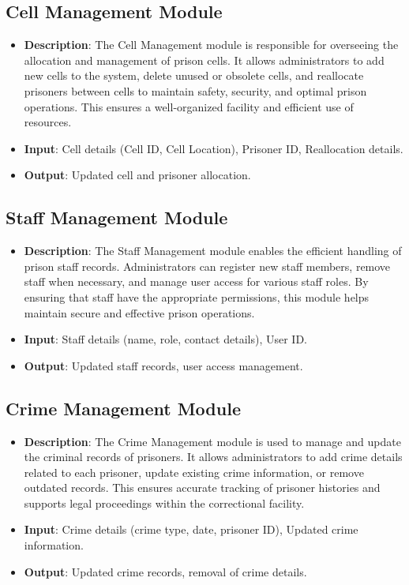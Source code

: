 \subsection*{Cell Management Module}
\begin{itemize}
    \item \textbf{Description}: The Cell Management module is responsible for overseeing the allocation and management of prison cells. It allows administrators to add new cells to the system, delete unused or obsolete cells, and reallocate prisoners between cells to maintain safety, security, and optimal prison operations. This ensures a well-organized facility and efficient use of resources.
    \item \textbf{Input}: Cell details (Cell ID, Cell Location), Prisoner ID, Reallocation details.
    \item \textbf{Output}: Updated cell and prisoner allocation.
\end{itemize}

\subsection*{Staff Management Module}
\begin{itemize}
    \item \textbf{Description}: The Staff Management module enables the efficient handling of prison staff records. Administrators can register new staff members, remove staff when necessary, and manage user access for various staff roles. By ensuring that staff have the appropriate permissions, this module helps maintain secure and effective prison operations.
    \item \textbf{Input}: Staff details (name, role, contact details), User ID.
    \item \textbf{Output}: Updated staff records, user access management.
\end{itemize}

\subsection*{Crime Management Module}
\begin{itemize}
    \item \textbf{Description}: The Crime Management module is used to manage and update the criminal records of prisoners. It allows administrators to add crime details related to each prisoner, update existing crime information, or remove outdated records. This ensures accurate tracking of prisoner histories and supports legal proceedings within the correctional facility.
    \item \textbf{Input}: Crime details (crime type, date, prisoner ID), Updated crime information.
    \item \textbf{Output}: Updated crime records, removal of crime details.
\end{itemize}

